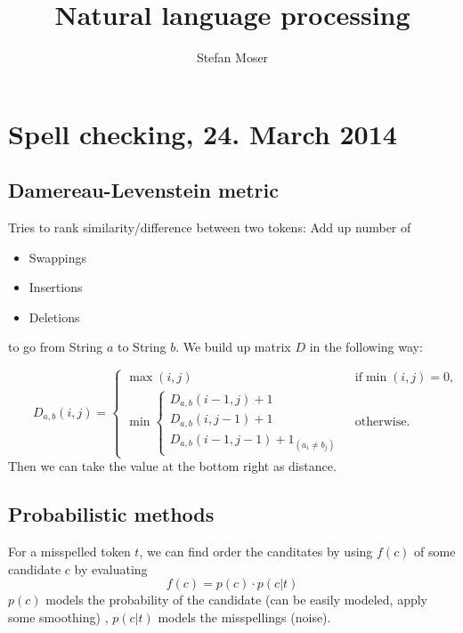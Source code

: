 \documentclass[11pt]{article}
\title{\textbf{Natural language processing}}
\author{Stefan Moser}
\date{}
\begin{document}
\maketitle

\section{Spell checking, 24. March 2014}

\subsection{Damereau-Levenstein metric}
\label{sub:levenstein}
Tries to rank similarity/difference between two tokens: Add up number of
\begin{itemize}
	\item Swappings
	\item Insertions
	\item Deletions
\end{itemize}
to go from String $a$ to String $b$. We build up matrix $D$ in the following way:

\begin{equation}
	\qquad D_{a,b}(i,j) = \begin{cases}
  \max(i,j) & \text{ if} \min(i,j)=0, \\
  \min \begin{cases}
          D_{a,b}(i-1,j) + 1 \\
          D_{a,b}(i,j-1) + 1 \\
          D_{a,b}(i-1,j-1) + 1_{(a_i \neq b_j)}
       \end{cases} & \text{ otherwise.}
\end{cases}
\end{equation}
Then we can take the value at the bottom right as distance.

\subsection{Probabilistic methods}
\label{sub:probabilistic_methods}

For a misspelled token $t$, we can find order the canditates by using $f(c)$ of some 
candidate $c$ by evaluating
\begin{equation}
	f(c) = p(c) \cdot p(c|t)
\end{equation}
$p(c)$ models the probability of the candidate (can be easily modeled, apply some smoothing)
, $p(c|t)$ models the misspellings (noise). 
\end{document}
